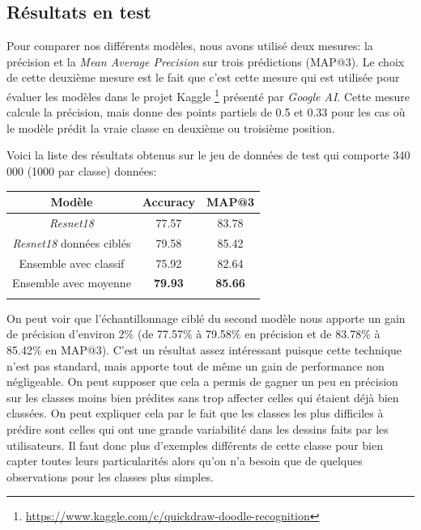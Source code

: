 
\subsection{Résultats en test}

Pour comparer nos différents modèles, nous avons utilisé deux mesures: la précision et la \emph{Mean Average Precision} sur trois prédictions (MAP@3).
Le choix de cette deuxième mesure est le fait que c'est cette mesure qui est utilisée pour évaluer les modèles dans le projet Kaggle \footnote{\url{https://www.kaggle.com/c/quickdraw-doodle-recognition}} présenté par \emph{Google AI}.
Cette mesure calcule la précision, mais donne des points partiels de 0.5 et 0.33 pour les cas où le modèle prédit la vraie classe en deuxième ou troisième position.

Voici la liste des résultats obtenus sur le jeu de données de test qui comporte 340 000 (1000 par classe) données:

\begin{center}
\setlength{\tabcolsep}{5mm}
\begin{tabular}{c c c}
\toprule
\textbf{Modèle} & \textbf{Accuracy} & \textbf{MAP@3}  \\


\midrule

\textit{Resnet18} & 77.57&83.78 \\
\textit{Resnet18} données ciblés  &79.58&85.42 \\
Ensemble avec classif  & 75.92 &82.64       \\
Ensemble avec moyenne     & \textbf{79.93}&\textbf{85.66}        \\



\bottomrule
\addlinespace[3mm]
\end{tabular}
\end{center}

On peut voir que l'échantillonnage ciblé du second modèle nous apporte un gain de précision d'environ 2\% (de 77.57\% à 79.58\% en précision et de 83.78\% à 85.42\% en MAP@3). 
C'est un résultat assez intéressant puisque cette technique n'est pas standard, mais apporte tout de même un gain de performance non négligeable. 
On peut supposer que cela a permis de gagner un peu en précision sur les classes moins bien prédites sans trop affecter celles qui étaient déjà bien classées.
On peut expliquer cela par le fait que les classes les plus difficiles à prédire sont celles qui ont une grande variabilité dans les dessins faits par les utilisateurs. 
Il faut donc plus d'exemples différents de cette classe pour bien capter toutes leurs particularités alors qu'on n'a besoin que de quelques observations pour les classes plus simples.


